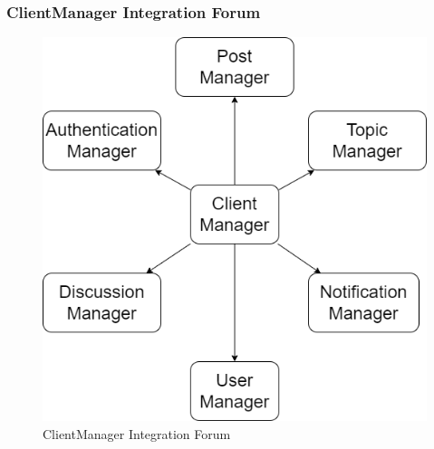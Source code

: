 \newpage
\subsubsection{ClientManager Integration Forum}
\begin{figure}[h!]
        \centering
        \includegraphics[scale=0.5]{images/component_integration/client_manager_forum_integration.png}
        \caption{ClientManager Integration Forum}
        \label{fig:client_manager_integration_forum}
\end{figure}
\FloatBarrier

\newpage
